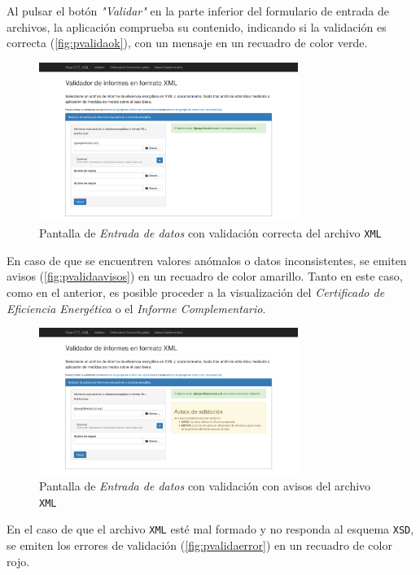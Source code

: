 \documentclass[10pt,notitlepage,oneside,a4paper]{article}
\begin{document}
Al pulsar el botón \textit{"Validar"} en la parte inferior del formulario de entrada de archivos, la aplicación comprueba su contenido, indicando si la validación es correcta (\autoref{fig:pvalidaok}), con un mensaje en un recuadro de color verde.

\begin{figure}[H]
  \centering
  \includegraphics[width=0.75\textwidth]{imagenes/pantalla_entradadatos_validaok}  
  \caption{Pantalla de \textit{Entrada de datos} con validación correcta del archivo \texttt{XML}}
  \label{fig:pvalidaok}
\end{figure}

En caso de que se encuentren valores anómalos o datos inconsistentes, se emiten avisos (\autoref{fig:pvalidaavisos}) en un recuadro de color amarillo. Tanto en este caso, como en el anterior, es posible proceder a la visualización del \textit{Certificado de Eficiencia Energética} o el \textit{Informe Complementario}.

\begin{figure}[H]
  \centering
  \includegraphics[width=0.75\textwidth]{imagenes/pantalla_entradadatos_validaavisos}  
  \caption{Pantalla de \textit{Entrada de datos} con validación con avisos del archivo \texttt{XML}}
  \label{fig:pvalidaavisos}
\end{figure}

En el caso de que el archivo \texttt{XML} esté mal formado y no responda al esquema \texttt{XSD}, se emiten los errores de validación (\autoref{fig:pvalidaerror}) en un recuadro de color rojo.
\end{document}
